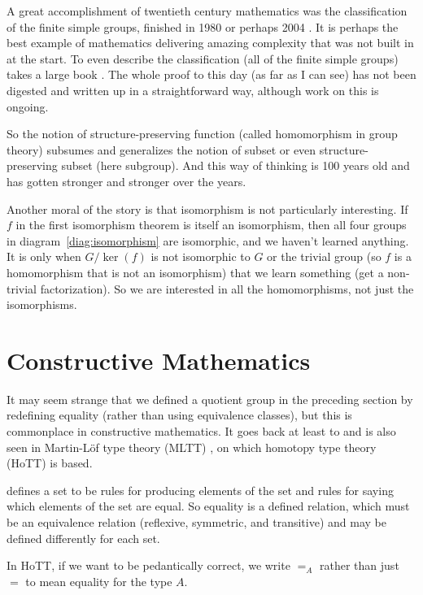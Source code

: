 \documentclass[11pt]{article}
\begin{document}
A great accomplishment of twentieth century mathematics was the
classification of the finite simple groups, finished in 1980 or perhaps 2004
\citep{aschbacher}.
It is perhaps the best example of mathematics delivering amazing
complexity that was not built in at the start.
To even describe the classification (all of the finite simple groups)
takes a large book
\citep[more than 300 pages if front matter is included]{wilson}.
The whole proof to this day (as far as I can see) has not been digested
and written up in a straightforward way, although work on this is ongoing.

So the notion of structure-preserving function (called homomorphism in group
theory) subsumes and generalizes the notion of subset or even
structure-preserving subset (here subgroup).
And this way of thinking is 100 years old and has gotten stronger and stronger
over the years.

Another moral of the story is that isomorphism is not particularly interesting.
If $f$ in the first isomorphism theorem is itself an isomorphism, then all
four groups in diagram~\eqref{diag:isomorphism} are isomorphic, and we haven't
learned anything.  It is only when
$G / \ker(f)$ is not isomorphic to $G$ or the trivial group
(so $f$ is a homomorphism that is not an isomorphism)
that we learn something (get a non-trivial factorization).
So we are interested in all the homomorphisms, not just the isomorphisms.

\section{Constructive Mathematics}
\label{sec:constructive}

It may seem strange that we defined a quotient group in the preceding section
by redefining equality (rather than using equivalence classes), but this
is commonplace in constructive mathematics.  It goes back at least to
\citet{bishop} and is also seen in Martin-L\"{o}f type theory (MLTT)
\citep{martin-lof-mltt}, on which
homotopy type theory (HoTT)
\citep[hereinafter referred to as the HoTT book]{hott-book} is based.

 defines a set to be rules for producing elements of the set
and rules for saying which elements of the set are equal.  So equality is
a defined relation, which must be an equivalence relation (reflexive,
symmetric, and transitive) and may be defined differently for each set.

In HoTT, if we want to be pedantically correct,
we write $=_A$ rather than just $=$ to mean equality for the type $A$.
\end{document}
